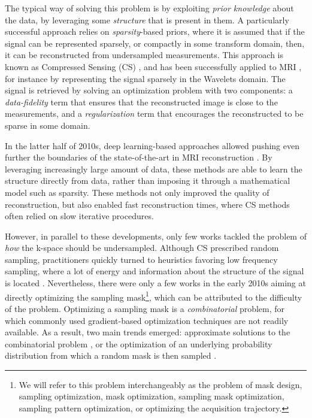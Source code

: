 The typical way of solving this problem is by exploiting \textit{prior knowledge} about the data, by leveraging some \textit{structure} that is present in them. A particularly successful approach relies on \textit{sparsity}-based priors, where it is assumed that if the signal can be represented sparsely, or compactly in some transform domain, then, it can be reconstructed from undersampled measurements. This approach is known as Compressed Sensing (CS) \citep{donoho2006compressed,candes2006robust}, and has been successfully applied to MRI \citep{lustig2008compressed}, for instance by representing the signal sparsely in the Wavelets domain. The signal is retrieved by solving an optimization problem with two components: a \textit{data-fidelity} term that ensures that the reconstructed image is close to the measurements, and a \textit{regularization} term that encourages the reconstructed to be sparse in some domain. 

In the latter half of 2010s, deep learning-based approaches allowed pushing even further the boundaries of the state-of-the-art in MRI reconstruction \citep{sun2016deep,schlemper2017deep,mardani2018neural}. By leveraging increasingly large amount of data, these methods are able to learn the structure directly from data, rather than imposing it through a mathematical model such as sparsity. These methods not only improved the quality of reconstruction, but also enabled fast reconstruction times, where CS methods often relied on slow iterative procedures.

However, in parallel to these developments, only few works tackled the problem of \textit{how} the k-space should be undersampled. Although CS prescribed random sampling, practitioners quickly turned to heuristics favoring low frequency sampling, where a lot of energy and information about the structure of the signal is located \citep{lustig2008compressed}. Nevertheless, there were only a few works in the early 2010s aiming at directly optimizing the sampling mask\footnote{We will refer to this problem interchangeably as the problem of mask design, sampling optimization, mask optimization, sampling mask optimization, sampling pattern optimization, or optimizing the acquisition trajectory.}, which can be attributed to the difficulty of the problem. Optimizing a sampling mask is a \textit{combinatorial} problem, for which commonly used gradient-based optimization techniques are not readily available. As a result, two main trends emerged: approximate solutions to the combinatorial problem \citep{ravishankar2011adaptive,liu2012under}, or the optimization of an underlying probability distribution from which a random mask is then sampled \citep{knoll2011adapted,chauffert2013variable}.

